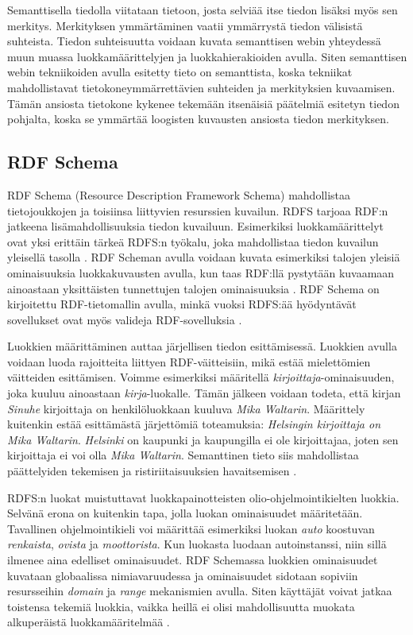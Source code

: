 \documentclass[finnish, 12pt, a4paper, elec, utf8, pdfa, online]{aaltothesis}
\begin{document}
{Semanttisella tiedolla viitataan tietoon, josta selviää itse tiedon lisäksi myös sen merkitys. Merkityksen ymmärtäminen vaatii ymmärrystä tiedon välisistä suhteista. Tiedon suhteisuutta voidaan kuvata semanttisen webin yhteydessä muun muassa luokkamäärittelyjen ja luokkahierakioiden avulla. Siten semanttisen webin tekniikoiden avulla esitetty tieto on semanttista, koska tekniikat mahdollistavat tietokoneymmärrettävien suhteiden ja merkityksien kuvaamisen. Tämän ansiosta tietokone kykenee tekemään itsenäisiä päätelmiä esitetyn tiedon pohjalta, koska se ymmärtää loogisten kuvausten ansiosta tiedon merkityksen.


\subsection{RDF Schema}
RDF Schema (Resource Description Framework Schema) mahdollistaa tietojoukkojen ja toisiinsa liittyvien resurssien kuvailun. RDFS tarjoaa RDF:n jatkeena lisämahdollisuuksia tiedon kuvailuun. Esimerkiksi luokkamäärittelyt ovat yksi erittäin tärkeä RDFS:n työkalu, joka mahdollistaa tiedon kuvailun yleisellä tasolla \cite{W3C_RDFS2}. RDF Scheman avulla voidaan kuvata esimerkiksi talojen yleisiä ominaisuuksia luokkakuvausten avulla, kun taas RDF:llä pystytään kuvaamaan ainoastaan yksittäisten tunnettujen talojen ominaisuuksia \cite{Antoniou}. RDF Schema on kirjoitettu RDF-tietomallin avulla, minkä vuoksi RDFS:ää hyödyntävät sovellukset ovat myös valideja RDF-sovelluksia \cite{RDF_specification_old}.

Luokkien määrittäminen auttaa järjellisen tiedon esittämisessä. Luokkien avulla voidaan luoda rajoitteita liittyen RDF-väitteisiin, mikä estää mielettömien väitteiden esittämisen. Voimme esimerkiksi määritellä \textit{kirjoittaja}-ominaisuuden, joka kuuluu ainoastaan \textit{kirja}-luokalle. Tämän jälkeen voidaan todeta, että kirjan \textit{Sinuhe} kirjoittaja on henkilöluokkaan kuuluva \textit{Mika Waltarin}. Määrittely kuitenkin estää esittämästä järjettömiä toteamuksia: \textit{Helsingin kirjoittaja on Mika Waltarin}. \textit{Helsinki} on kaupunki ja kaupungilla ei ole kirjoittajaa, joten sen kirjoittaja ei voi olla \textit{Mika Waltarin}. Semanttinen tieto siis mahdollistaa päättelyiden tekemisen ja ristiriitaisuuksien havaitsemisen \cite{Antoniou}.

RDFS:n luokat muistuttavat luokkapainotteisten olio-ohjelmointikielten luokkia. Selvänä erona on kuitenkin tapa, jolla luokan ominaisuudet määritetään. Tavallinen ohjelmointikieli voi määrittää esimerkiksi luokan \textit{auto} koostuvan \textit{renkaista}, \textit{ovista} ja \textit{moottorista}. Kun luokasta luodaan autoinstanssi, niin sillä ilmenee aina edelliset ominaisuudet. RDF Schemassa luokkien ominaisuudet kuvataan globaalissa nimiavaruudessa ja ominaisuudet sidotaan sopiviin resursseihin \textit{domain} ja \textit{range} mekanismien avulla. Siten käyttäjät voivat jatkaa toistensa tekemiä luokkia, vaikka heillä ei olisi mahdollisuutta muokata alkuperäistä luokkamääritelmää \cite{Antoniou} \cite{W3C_RDFS2}.

}
\end{document}
